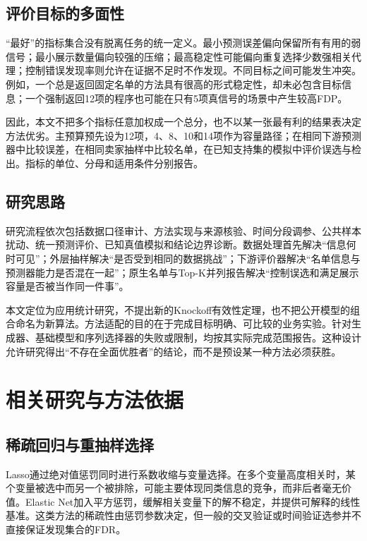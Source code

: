 \documentclass{sufethesismas}
\begin{document}
\section{评价目标的多面性}

``最好''的指标集合没有脱离任务的统一定义。最小预测误差偏向保留所有有用的弱信号；最小展示数量偏向较强的压缩；最高稳定性可能偏向重复选择少数强相关代理；控制错误发现率则允许在证据不足时不作发现。不同目标之间可能发生冲突。例如，一个总是返回固定名单的方法具有很高的形式稳定性，却未必包含目标信息；一个强制返回12项的程序也可能在只有5项真信号的场景中产生较高FDP。

因此，本文不把多个指标任意加权成一个总分，也不以某一张最有利的结果表决定方法优劣。主预算预先设为12项，4、8、10和14项作为容量路径；在相同下游预测器中比较误差，在相同卖家抽样中比较名单，在已知支持集的模拟中评价误选与检出。指标的单位、分母和适用条件分别报告。

\section{研究思路}

研究流程依次包括数据口径审计、方法实现与来源核验、时间分段调参、公共样本扰动、统一预测评价、已知真值模拟和结论边界诊断。数据处理首先解决``信息何时可见''；外层抽样解决``是否受到相同的数据挑战''；下游评价器解决``名单信息与预测器能力是否混在一起''；原生名单与Top-K并列报告解决``控制误选和满足展示容量是否被当作同一件事''。

本文定位为应用统计研究，不提出新的Knockoff有效性定理，也不把公开模型的组合命名为新算法。方法适配的目的在于完成目标明确、可比较的业务实验。针对生成器、基础模型和序列选择器的失败或限制，均按其实际完成范围报告。这种设计允许研究得出``不存在全面优胜者''的结论，而不是预设某一种方法必须获胜。

\chapter{相关研究与方法依据}

\section{稀疏回归与重抽样选择}

Lasso通过绝对值惩罚同时进行系数收缩与变量选择\cite{lasso1996}。在多个变量高度相关时，某个变量被选中而另一个被排除，可能主要体现同类信息的竞争，而非后者毫无价值。Elastic Net加入平方惩罚，缓解相关变量下的解不稳定，并提供可解释的线性基准\cite{elastic2005}。这类方法的稀疏性由惩罚参数决定，但一般的交叉验证或时间验证选参并不直接保证发现集合的FDR。
\end{document}
